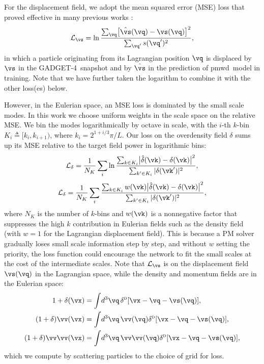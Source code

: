 \documentclass[modern, trackchanges, dvipsnames]{aastex631}
\newcommand{\pmwd}{{\usefont{T1}{nova}{m}{sl}pmwd}}
\newcommand{\GADGET}{{{\fontsize{10pt}{12pt}\selectfont GADGET}-4}}
\newcommand{\deltaD}{\delta^\textsc{d}}
\renewcommand{\d}{d}
\newcommand{\cL}{\mathcal{L}}
\newcommand{\YL}[1]{\textcolor{Bittersweet}{#1}}
\begin{document}
For the displacement field, we adopt the mean squared error (MSE) loss
that proved effective in many previous works
\citep[e.g.,][]{HeEtAl2019, LiEtAl2021}:
%
\begin{equation}
\cL_\vs = \ln \frac{\sum_\vq \bigl[ \hat\vs(\vq) - \vs(\vq) \bigr]^2}
                   {\sum_{\vq'} s(\vq')^2},
\end{equation}
%
in which a particle originating from its Lagrangian position $\vq$ is
displaced by $\vs$ in the \GADGET\ snapshot and by $\hat\vs$ in the
prediction of \pmwd\ model in training.
Note that we have further taken the logarithm to combine it with the
other loss(es) below.


However, in the Eulerian space, an MSE loss is dominated by the small
scale modes.
In this work we choose uniform weights in the scale space on the
relative MSE.
We bin the modes logarithmically by  octave in scale, with
the $i$-th $k$-bin $K_i \triangleq [k_i, k_{i+1})$, where $k_i =
2^{1+i/3} \pi / L$.
Our loss on the overdensity field $\delta$ sums up its MSE relative to
the target field power in logarithmic bins:
%
\begin{equation}
\cL_\delta = \frac1{N_K} \sum_i \ln
\frac{\sum_{k \in K_i} \bigl| \hat\delta(\vk) - \delta(\vk) \bigr|^2}
     {\sum_{k' \in K_i} |\delta(\vk')|^2},
\end{equation}
%
\begin{equation}
\cL_\delta = \frac1{N_K} \sum_i
\frac{\sum_{k \in K_i} w(\vk)
      \bigl| \hat\delta(\vk) - \delta(\vk) \bigr|^2}
     {\sum_{k' \in K_i} |\delta(\vk')|^2},
\end{equation}
%
where $N_K$ is the number of $k$-bins and $w(\vk)$ is a nonnegative
factor that suppresses the high $k$ contribution in Eulerian fields such
as the density field (with $w=1$ for the Lagrangian displacement field).
This is because a PM solver gradually loses small scale information step
by step, and without $w$ setting the priority, the loss function could
encourage the network to fit the small scales at the cost of the
intermediate scales.
Note that $\cL_\vs$ is on the displacement field $\vs(\vq)$ in the
Lagrangian space, while the density and momentum fields are in the
Eulerian space:
%
\begin{align}
1 + \delta(\vx) &= \int\!\d^3\vq\,
  \deltaD[ \vx - \vq - \vs(\vq)], \nonumber\\
(1 + \delta)\vv(\vx) &= \int\!\d^3\vq\,
  \vv(\vq) \deltaD[ \vx - \vq - \vs(\vq)], \nonumber\\
(1 + \delta)\vv\vv(\vx) &= \int\!\d^3\vq\,
  \vv\vv(\vq) \deltaD[ \vx - \vq - \vs(\vq)], \nonumber\\
\end{align}
%
which we compute by scattering particles to the choice of grid for loss.
\end{document}
